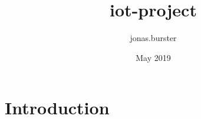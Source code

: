 \documentclass{article}
\title{iot-project}
\author{jonas.burster }
\date{May 2019}
\begin{document}
\maketitle

\section{Introduction}
\end{document}
